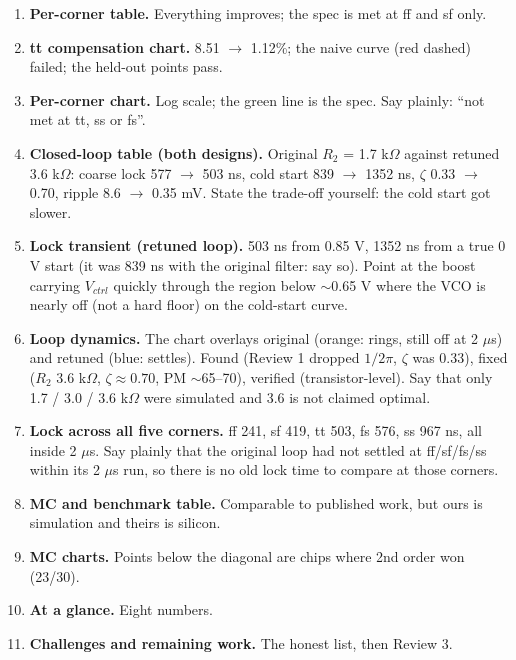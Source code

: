 \documentclass[11pt,a4paper]{article}
\begin{document}
\begin{enumerate}[label=\textbf{\arabic*.}]
\item[15.] \textbf{Per-corner table.} Everything improves; the spec is met at ff and sf only.
\item[16.] \textbf{tt compensation chart.} 8.51 $\to$ 1.12\%; the naive curve (red dashed) failed; the held-out points pass.
\item[17.] \textbf{Per-corner chart.} Log scale; the green line is the spec. Say plainly: ``not met at tt, ss or fs''.
\item[18.] \textbf{Closed-loop table (both designs).} Original $R_2$ = 1.7 k$\Omega$ against retuned 3.6 k$\Omega$: coarse lock 577 $\to$ 503 ns, cold start 839 $\to$ 1352 ns, $\zeta$ 0.33 $\to$ 0.70, ripple 8.6 $\to$ 0.35 mV. State the trade-off yourself: the cold start got slower.
\item[19.] \textbf{Lock transient (retuned loop).} 503 ns from 0.85 V, 1352 ns from a true 0 V start (it was 839 ns with the original filter: say so). Point at the boost carrying $V_{ctrl}$ quickly through the region below $\sim$0.65 V where the VCO is nearly off (not a hard floor) on the cold-start curve.
\item[20.] \textbf{Loop dynamics.} The chart overlays original (orange: rings, still off at 2 $\mu$s) and retuned (blue: settles). Found (Review 1 dropped $1/2\pi$, $\zeta$ was 0.33), fixed ($R_2$ 3.6 k$\Omega$, $\zeta\approx0.70$, PM $\sim$65--70\textdegree), verified (transistor-level). Say that only 1.7 / 3.0 / 3.6 k$\Omega$ were simulated and 3.6 is not claimed optimal.
\item[21.] \textbf{Lock across all five corners.} ff 241, sf 419, tt 503, fs 576, ss 967 ns, all inside 2 $\mu$s. Say plainly that the original loop had not settled at ff/sf/fs/ss within its 2 $\mu$s run, so there is no old lock time to compare at those corners.
\item[22.] \textbf{MC and benchmark table.} Comparable to published work, but ours is simulation and theirs is silicon.
\item[23.] \textbf{MC charts.} Points below the diagonal are chips where 2nd order won (23/30).
\item[24.] \textbf{At a glance.} Eight numbers.
\item[25.] \textbf{Challenges and remaining work.} The honest list, then Review 3.
\end{enumerate}

\end{document}
